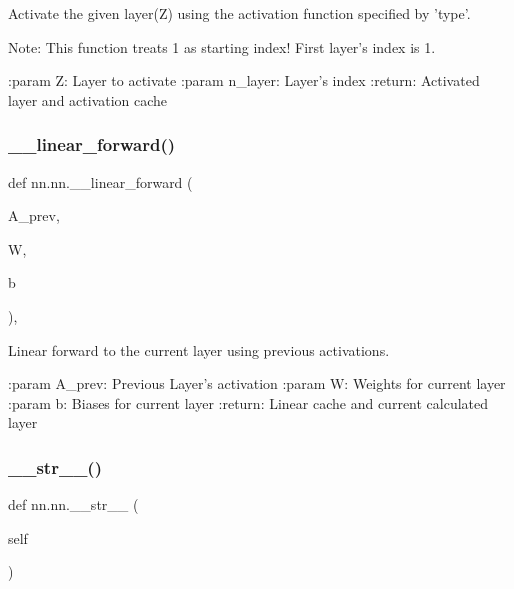 \begin{DoxyVerb}Activate the given layer(Z) using the activation function specified by
'type'.

Note: This function treats 1 as starting index!
      First layer's index is 1.

:param Z: Layer to activate
:param n_layer: Layer's index
:return: Activated layer and activation cache
\end{DoxyVerb}
 \mbox{\label{classnn_1_1nn_a78173fb77f846a71e27f097b29e701f8}} 
\subsubsection{\texorpdfstring{\+\_\+\+\_\+linear\+\_\+forward()}{\_\_linear\_forward()}}
{\footnotesize\ttfamily def nn.\+nn.\+\_\+\+\_\+linear\+\_\+forward (\begin{DoxyParamCaption}\item[{}]{A\+\_\+prev,  }\item[{}]{W,  }\item[{}]{b }\end{DoxyParamCaption})\hspace{0.3cm}{\ttfamily [static]}, {\ttfamily [private]}}

\begin{DoxyVerb}Linear forward to the current layer using previous activations.

:param A_prev: Previous Layer's activation
:param W: Weights for current layer
:param b: Biases for current layer
:return: Linear cache and current calculated layer
\end{DoxyVerb}
 \mbox{\label{classnn_1_1nn_a1c967a0ae06ef2a7e8077cc9aa29aabc}} 
\subsubsection{\texorpdfstring{\+\_\+\+\_\+str\+\_\+\+\_\+()}{\_\_str\_\_()}}
{\footnotesize\ttfamily def nn.\+nn.\+\_\+\+\_\+str\+\_\+\+\_\+ (\begin{DoxyParamCaption}\item[{}]{self }\end{DoxyParamCaption})}

